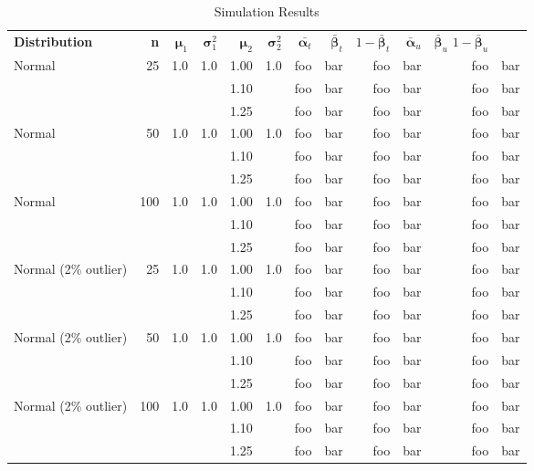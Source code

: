 \documentclass{report}
\begin{document}
\begin{table}[h]
	\centering
	\caption{Simulation Results}
	\vspace{1em}
	\begin{threeparttable}
	\begin{tabular}{|l r r r r r r r r r r r|}
		\hline
		\textbf{Distribution} & 
		\textbf{n} & 
		$\bm{\mu}_1$ &
		$\bm{\sigma}^2_1$ & 
		$\bm{\mu}_2$ &
		$\bm{\sigma}^2_2$ & 
		$\bar{\bm{\alpha}_t}$ & 
		$\bar{\bm{\beta}}_t$ &
		$1 - \bar{\bm{\beta}}_t$ & 
		$\bar{\bm{\alpha}}_u$ & 
		$\bar{\bm{\beta}}_u$
		$1 - \bar{\bm{\beta}}_u$ \\

		Normal & 25 & 1.0 & 1.0 & 1.00 & 1.0 & foo & bar & foo & bar & foo & bar \\
		       &    &     &     & 1.10 &     & foo & bar & foo & bar  & foo & bar \\
		       &    &     &     & 1.25 &     & foo & bar & foo & bar & foo & bar \\
		Normal & 50 & 1.0 & 1.0 & 1.00 & 1.0 & foo & bar & foo & bar & foo & bar \\
		       &    &     &     & 1.10 &     & foo & bar & foo & bar & foo & bar \\
		       &    &     &     & 1.25 &     & foo & bar & foo & bar & foo & bar \\
		Normal & 100 & 1.0 & 1.0 & 1.00 & 1.0 & foo & bar & foo & bar & foo & bar \\
		       &    &     &     & 1.10 &      & foo & bar & foo & bar & foo & bar \\
		       &    &     &     & 1.25 &      & foo & bar & foo & bar & foo & bar \\

		Normal (2\% outlier) & 25 & 1.0 & 1.0 & 1.00 & 1.0 & foo & bar & foo & bar& foo & bar \\
		       &    &     &     & 1.10 &     & foo & bar & foo & bar & foo & bar \\
		       &    &     &     & 1.25 &     & foo & bar & foo & bar & foo & bar \\
		Normal (2\% outlier) & 50 & 1.0 & 1.0 & 1.00 & 1.0 & foo & bar & foo & bar & foo & bar \\
		       &    &     &     & 1.10 &     & foo & bar & foo & bar & foo & bar \\
		       &    &     &     & 1.25 &     & foo & bar & foo & bar & foo & bar \\
		Normal (2\% outlier) & 100 & 1.0 & 1.0 & 1.00 & 1.0 & foo & bar & foo & bar& foo & bar \\ 
		       &    &     &     & 1.10 &      & foo & bar & foo & bar & foo & bar \\
		       &    &     &     & 1.25 &      & foo & bar & foo & bar & foo & bar \\


\end{tabular}
\end{threeparttable}
\end{table}
\end{document}

